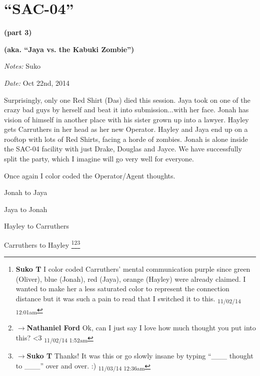 \setcounter{chapter}{ 34 }
\chapter{\textbf{``SAC-04''} }




\begin{center}
 {\LARGE \textbf{(part 3)} } 
\end{center}


\begin{center}
 {\LARGE \textbf{(aka. ``Jaya vs. the Kabuki Zombie'')} } 
\end{center}




\textit{Notes:} Suko

\textit{Date:} Oct 22nd, 2014



Surprisingly, only one Red Shirt (Das) died this session.  Jaya took on one of the crazy bad guys by herself and beat it into submission...with her face.  Jonah has vision of himself in another place with his sister grown up into a lawyer.  Hayley gets Carruthers in her head as her new Operator.  Hayley and Jaya end up on a rooftop with lots of Red Shirts, facing a horde of zombies.  Jonah is alone inside the SAC-04 facility with just Drake, Douglas and Jayce.  We have successfully split the party, which I imagine will go very well for everyone.



Once again I color coded the Operator/Agent thoughts.

 {\color[RGB]{74,134,232}Jonah to Jaya} 

 {\color[RGB]{255,0,0}Jaya to Jonah} 

 {\color[RGB]{230,145,56}Hayley to Carruthers} 

 {\color[RGB]{153,0,255}Carruthers to Hayley}  {\color[RGB]{153,0,255} } \footnote{\textbf{Suko T }I color coded Carruthers' mental communication purple since green (Oliver), blue (Jonah), red (Jaya), orange (Hayley) were already claimed.  I wanted to make her a less saturated color to represent the connection distance but it was such a pain to read that I switched it to this. \textsubscript{11/02/14 12:01am}}\footnote{$\rightarrow$\textbf{Nathaniel Ford }Ok, can I just say I love how much thought you put into this? \textless 3 \textsubscript{11/02/14 1:52am}}\footnote{$\rightarrow$\textbf{Suko T }Thanks!  It was this or go slowly insane by typing ``\_\_\_ thought to \_\_\_'' over and over. :) \textsubscript{11/03/14 12:36am}}



